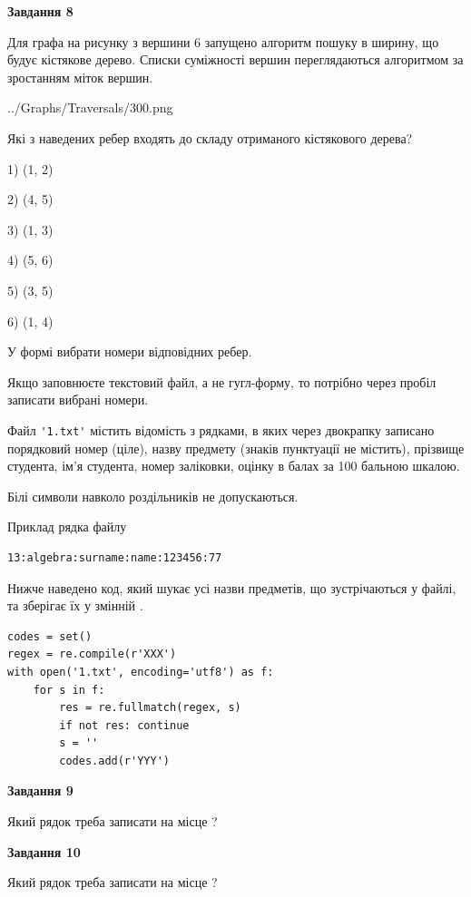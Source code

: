 \documentclass[12pt, ukrainian]{article}
\def\code#1{\Verb!#1!}
\begin{document}
{\begin {large}
{\begin {center}\textbf{Завдання 8}\end {center}}\par
Для графа на рисунку з вершини 6 запущено алгоритм пошуку в ширину, що будує кістякове дерево. Списки суміжності вершин переглядаються алгоритмом за зростанням міток вершин.\par
\begin{center}
	{../Graphs/Traversals/300.png}
\end{center}
\par Які з наведених ребер входять до складу отриманого кістякового дерева?\par
1) (1, 2)\par
2) (4, 5)\par
3) (1, 3)\par
4) (5, 6)\par
5) (3, 5)\par
6) (1, 4)\par
{\vskip 15pt} У формі вибрати номери відповідних ребер.


Якщо заповнюєте текстовий файл, а не гугл-форму, то потрібно через пробіл записа\-ти вибрані номери.\par
\newpage


Файл \code{'1.txt'} містить відомість з рядками, в яких через двокрапку записано поряд\-ковий номер (ціле), назву предмету (знаків пунктуації не містить), прізвище студента, ім'я студента, номер заліковки, оцінку в балах за 100 бальною шкалою.

Білі символи навколо роздільників не допускаються.

Приклад рядка файлу



\begin{verbatim}
13:algebra:surname:name:123456:77
\end{verbatim}


Нижче наведено код, який шукає усі назви предметів, що зустрічаються у файлі, та зберігає їх у змінній .



\begin{verbatim}
codes = set()
regex = re.compile(r'XXX')
with open('1.txt', encoding='utf8') as f:
    for s in f:
        res = re.fullmatch(regex, s)
        if not res: continue
        s = ''
        codes.add(r'YYY')
\end{verbatim}


{\begin {center}\textbf{Завдання 9}\end {center}}\par
Який рядок треба записати на місце  ?\par
\vspace{5mm}


{\begin {center}\textbf{Завдання 10}\end {center}}\par
Який рядок треба записати на місце  ?\par


\newpage


\end {large}}
\end{document}
